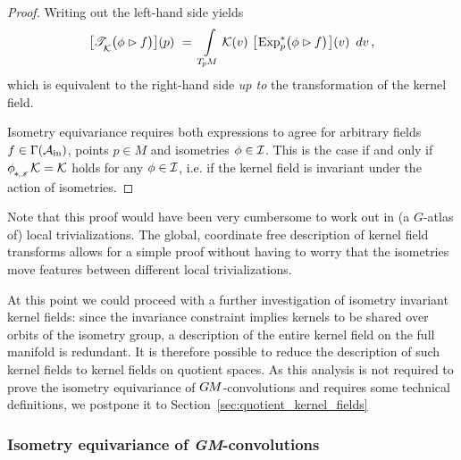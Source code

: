 \begin{proof}
    Writing out the left-hand side yields
    \begin{align}
        \big[ \TK \big(\phi \rhd f\big) \big](p)
        \ =\ \int\limits_{\TpM}
                \K(v) \ 
                \big[\mkern-2mu \Expsp\!\big( \phi\rhd f\big) \mkern1mu\big] (v)
                \,\ dv \,,
    \end{align}
    which is equivalent to the right-hand side \emph{up to} the transformation of the kernel field.

    Isometry equivariance requires both expressions to agree for arbitrary fields $f\in\Gamma(\mathcal{A}_\textup{in})$, points $p\in M$ and isometries $\phi\in\mathcal{I}$.
    This is the case if and only if $\dphiK \K = \K$ holds for any $\phi \in \mathcal{I}$, i.e. if the kernel field is invariant under the action of isometries.
\end{proof}
Note that this proof would have been very cumbersome to work out in (a $G$-atlas of) local trivializations.
The global, coordinate free description of kernel field transforms allows for a simple proof without having to worry that the isometries move features between different local trivializations.


At this point we could proceed with a further investigation of isometry invariant kernel fields:
since the invariance constraint implies kernels to be shared over orbits of the isometry group, a description of the entire kernel field on the full manifold is redundant.
It is therefore possible to reduce the description of such kernel fields to kernel fields on quotient spaces.
As this analysis is not required to prove the isometry equivariance of $G\mkern-1.4muM$-convolutions and requires some technical definitions, we postpone it to Section~\ref{sec:quotient_kernel_fields}




















\subsubsection{Isometry equivariance of \textit{GM}-convolutions}
\label{sec:isom_equiv_GM_conv}

